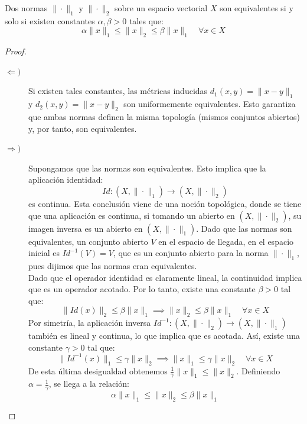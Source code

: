 \begin{prop}
    Dos normas $\|\cdot\|_1$ y $\|\cdot\|_2$ sobre un espacio vectorial $X$ son equivalentes si y solo si existen constantes $\alpha, \beta > 0$ tales que:
    \begin{equation*}
        \alpha \|x\|_1 \leq \|x\|_2 \leq \beta \|x\|_1 \quad \forall x \in X
    \end{equation*}

\begin{proof}
    \begin{description}
        \item[$\Longleftarrow)$] Si existen tales constantes, las métricas inducidas $d_1(x,y) = \|x-y\|_1$ y $d_2(x,y) = \|x-y\|_2$ son uniformemente equivalentes. Esto garantiza que ambas normas definen la misma topología (mismos conjuntos abiertos) y, por tanto, son equivalentes.
        \item[$\Longrightarrow)$] Supongamos que las normas son equivalentes. Esto implica que la aplicación identidad:
        \begin{equation*}
            Id: (X, \|\cdot\|_1) \longrightarrow (X, \|\cdot\|_2)
        \end{equation*}
        es continua. Esta conclusión viene de una noción topológica, donde se tiene que una aplicación es continua, si tomando un abierto en $(X, \|\cdot\|_2)$, su imagen inversa es un abierto en $(X, \|\cdot\|_1)$. Dado que las normas son equivalentes, un conjunto abierto $V$ en el espacio de llegada, en el espacio inicial es $Id^{-1}(V)=V$, que es un conjunto abierto para la norma $\|\cdot\|_1$, pues dijimos que las normas eran equivalentes. \\

        \noindent
        Dado que el operador identidad es claramente lineal, la continuidad implica que es un operador acotado. Por lo tanto, existe una constante $\beta > 0$ tal que:
        \begin{equation*}
            \|Id(x)\|_2 \leq \beta \|x\|_1 \implies \|x\|_2 \leq \beta \|x\|_1 \quad \forall x \in X
        \end{equation*}
        Por simetría, la aplicación inversa $Id^{-1}: (X, \|\cdot\|_2) \longrightarrow (X, \|\cdot\|_1)$ también es lineal y continua, lo que implica que es acotada. Así, existe una constante $\gamma > 0$ tal que:
        \begin{equation*}
            \|Id^{-1}(x)\|_1 \leq \gamma \|x\|_2 \implies \|x\|_1 \leq \gamma \|x\|_2 \quad \forall x \in X
        \end{equation*}
        De esta última desigualdad obtenemos $\frac{1}{\gamma} \|x\|_1 \leq \|x\|_2$. Definiendo $\alpha = \frac{1}{\gamma}$, se llega a la relación:
        \begin{equation*}
            \alpha \|x\|_1 \leq \|x\|_2 \leq \beta \|x\|_1
        \end{equation*}
    \end{description}
\end{proof}    
\end{prop}

